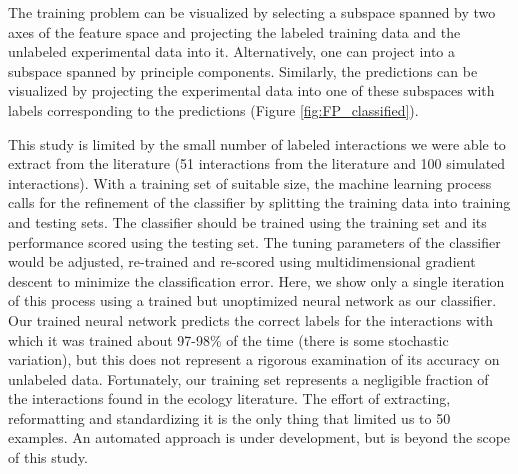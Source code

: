 The training problem can be visualized by selecting a subspace spanned by two axes of the feature space and projecting the labeled training data and the unlabeled experimental data into it. Alternatively, one can project into a subspace spanned by principle components. Similarly, the predictions can be visualized by projecting the experimental data into one of these subspaces with labels corresponding to the predictions (Figure \ref{fig:FP_classified}).



This study is limited by the small number of labeled interactions we were able to extract from the literature (51 interactions from the literature and 100 simulated interactions). With a training set of suitable size, the machine learning process calls for the refinement of the classifier by splitting the training data into training and testing sets. The classifier should be trained using the training set and its performance scored using the testing set. The tuning parameters of the classifier would be adjusted, re-trained and re-scored using multidimensional gradient descent to minimize the classification error. Here, we show only a single iteration of this process using a trained but unoptimized neural network as our classifier. Our trained neural network predicts the correct labels for the interactions with which it was trained about 97-98\% of the time (there is some stochastic variation), but this does not represent a rigorous examination of its accuracy on unlabeled data. Fortunately, our training set represents a negligible fraction of the interactions found in the ecology literature. The effort of extracting, reformatting and standardizing it is the only thing that limited us to 50 examples. An automated approach is under development, but is beyond the scope of this study.
